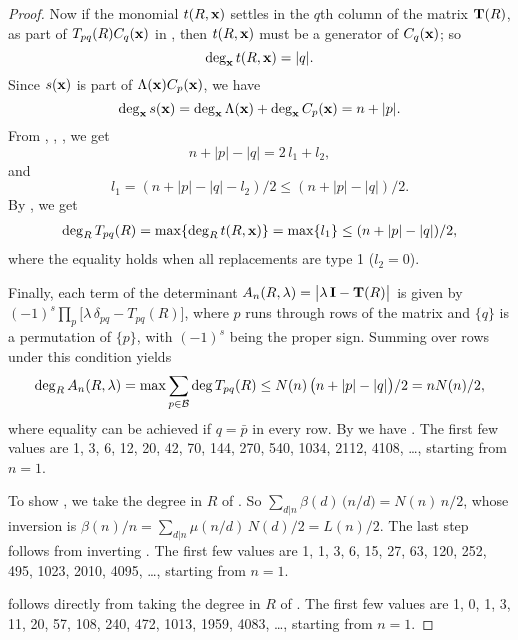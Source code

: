 \documentclass{ws-ijbc}
\begin{document}
\begin{proof}
%
Now if the monomial $t(R, \mathbf{x})$ settles in the $q$th column of
  the matrix $\mathbf{T}(R)$, as part
  of $T_{pq}(R) C_q(\mathbf{x})$ in ,
then
  $t(R, \mathbf{x})$
  must be
  a generator of $C_q(\mathbf{x})$;
so
%
\begin{equation}
  \deg_{\mathbf{x}} t(R, \mathbf{x}) = |q|.
\label{eq:degxt}
\end{equation}
%
Since $s(\mathbf{x})$ is part of $\Lambda(\mathbf{x}) C_p(\mathbf{x})$,
  we have
%
\begin{equation}
  \deg_{\mathbf{x}} s(\mathbf{x}) = \deg_{\mathbf{x}} \Lambda(\mathbf{x}) + \deg_{\mathbf{x}} C_p(\mathbf{x})
  = n + |p|.
\label{eq:degxs}
\end{equation}
%
%
From , , , we get
\[
  n + |p| - |q| = 2 \, l_1 + l_2,
\]
and
\begin{equation}
  l_1  =    (n + |p| - |q| - l_2)/2
             \le  (n + |p| - |q|)/2.
\label{eq:l1limit}
\end{equation}
By , we get
\begin{align*}
  \deg_R T_{pq}(R)
  = \max\{ \deg_R t(R, \mathbf{x}) \}
  = \max\{ l_1 \}
  \le   (n + |p| - |q|)/2,
\end{align*}
where the equality holds when all replacements are type 1 ($l_2 = 0$).


Finally, each term of the determinant
$A_n(R, \lambda) = \big|\lambda \, \mathbf{I} - \mathbf{T}(R)\big|$
is given by
$(-1)^s \prod_{p} \big[\lambda \, \delta_{p q} - T_{pq}(R)\big]$,
where $p$ runs through rows of the matrix
  and $\{q\}$ is a permutation of $\{p\}$,
  with $(-1)^s$ being the proper sign.
Summing over rows under this condition yields
\begin{align*}
  \deg_R A_n(R, \lambda)
  = \max \sum_{p \in \mathcal B} \deg T_{pq}(R)
  \le N(n) \, \big(n + |p| - |q|\big)/2 = n N(n)/2,
\end{align*}
where equality can be achieved if $q = \bar p$ in every row.
By  we have .
%
The first few values are 1, 3, 6, 12, 20, 42, 70, 144, 270, 540, 1034, 2112, 4108, \dots, starting from $n = 1$.



To show , we take the degree in $R$ of .
So $\sum_{d|n} \beta(d) \, \big(n/d\big) = N(n) \, n/2$,
whose inversion is
  $\beta(n)/n = \sum_{d|n} \mu(n/d) \, N(d)/2 = L(n)/2$.
The last step follows from inverting .
%
The first few values are 1, 1, 3, 6, 15, 27, 63, 120, 252, 495, 1023, 2010, 4095, \dots, starting from $n = 1$.

 follows directly from taking the degree in $R$ of .
The first few values are 1, 0, 1, 3, 11, 20, 57, 108, 240, 472, 1013, 1959, 4083, \dots, starting from $n = 1$.
\end{proof}
\end{document}
